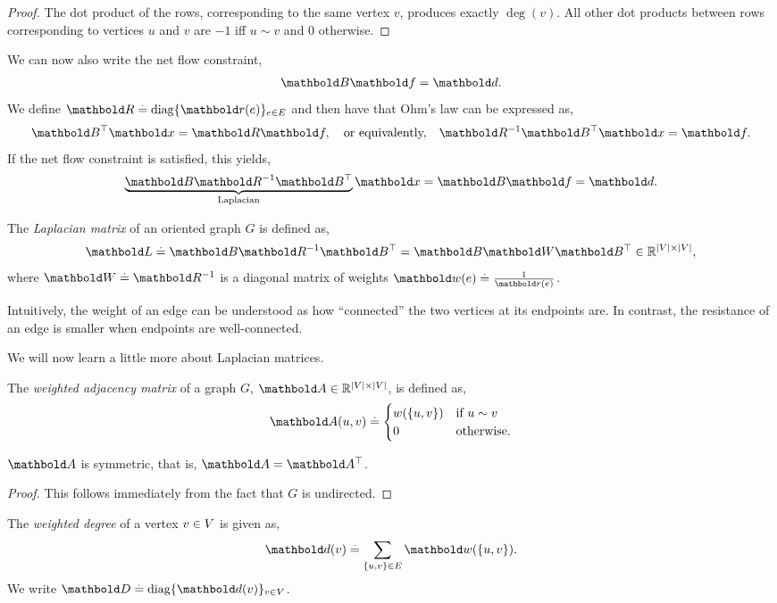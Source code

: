 \begin{proof} The dot product of the rows, corresponding to the same vertex $v$, produces exactly $\deg(v)$. All other dot products between rows corresponding to vertices $u$ and $v$ are $-1$ iff $u \sim v$ and $0$ otherwise.
\end{proof}
We can now also write the net flow constraint, \begin{align}
    \mB\vf = \vd.
\end{align} We define $\mR \defeq \diag\{\vr(e)\}_{e \in \sE}$ and then have that Ohm's law can be expressed as, \begin{align}
    \trans{\mB}\vx = \mR\vf, \quad\text{or equivalently,}\quad \mR^{-1}\trans{\mB}\vx = \vf.
\end{align} If the net flow constraint is satisfied, this yields, \begin{align}
    \underbrace{\mB\mR^{-1}\trans{\mB}}_{\text{Laplacian}}\vx = \mB\vf = \vd. \label{eq:ohms_law_and_net_flow_constraint}
\end{align}
\begin{defn}\label{defn:laplacian_matrix}
The \emph{Laplacian matrix} of an oriented graph $G$ is defined as, \begin{align}
    \mL \defeq \mB\mR^{-1}\trans{\mB} = \mB\mW\trans{\mB} \in \R^{|\sV|\times|\sV|},
\end{align} where $\mW \defeq \mR^{-1}$ is a diagonal matrix of weights $\vw(e) \defeq \frac{1}{\vr(e)}$.
\end{defn}\noindent Intuitively, the weight of an edge can be understood as how ``connected'' the two vertices at its endpoints are. In contrast, the resistance of an edge is smaller when endpoints are well-connected.

We will now learn a little more about Laplacian matrices.
\begin{defn}
The \emph{weighted adjacency matrix} of a graph $G$, $\mA \in \R^{|\sV|\times|\sV|}$, is defined as, \begin{align}
    \mA(u, v) \defeq \begin{cases}
        w(\{u,v\}) & \text{if $u \sim v$} \\
        0 & \text{otherwise}.
    \end{cases}
\end{align}
\end{defn}
\begin{lem}
$\mA$ is symmetric, that is, $\mA = \trans{\mA}$.
\end{lem}
\begin{proof}
This follows immediately from the fact that $G$ is undirected.
\end{proof}
\begin{defn}
The \emph{weighted degree} of a vertex $v \in V$ is given as, \begin{align}
    \vd(v) \defeq \sum_{\{u,v\} \in \sE} \vw(\{u,v\}).
\end{align} We write $\mD \defeq \diag\{\vd(v)\}_{v \in \sV}$.
\end{defn}

